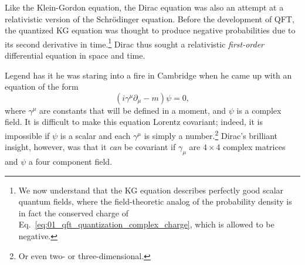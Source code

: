 
Like the Klein-Gordon equation, the Dirac equation was also an attempt at a relativistic version of the Schrödinger equation.
Before the development of QFT, the quantized KG equation was thought to produce negative probabilities due to its second derivative in time.\footnote{We now understand that the KG equation describes perfectly good scalar quantum fields, where the field-theoretic analog of the probability density is in fact the conserved charge of Eq.~\ref{eq:01_qft_quantization_complex_charge}, which is allowed to be negative.}
Dirac thus sought a relativistic \textit{first-order} differential equation in space and time.

Legend has it he was staring into a fire in Cambridge when he came up with an equation of the form
\begin{equation}
	\label{eq:01_qft_spinors_dirac}
	(i\gamma^\mu \partial_\mu - m)\psi = 0,
\end{equation}
where $\gamma^\mu$ are constants that will be defined in a moment, and $\psi$ is a complex field.
It is difficult to make this equation Lorentz covariant; indeed, it is impossible if $\psi$ is a scalar and each $\gamma^\mu$ is simply a number.\footnote{Or even two- or three-dimensional.}
Dirac's brilliant insight, however, was that it \textit{can} be covariant if $\gamma_\mu$ are $4\times 4$ complex matrices and $\psi$ a four component field.

